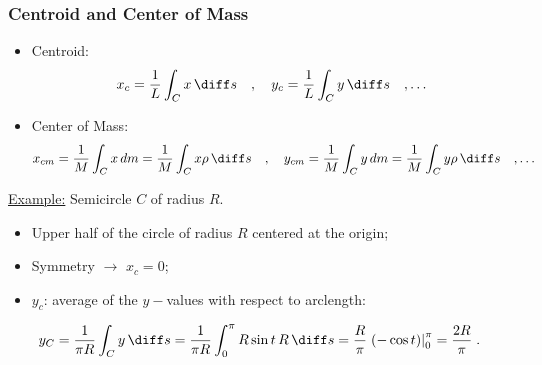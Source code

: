 \begin{frame}
\small
  \frametitle{Centroid and Center of Mass}

\begin{itemize}
\item Centroid:
	$$x_c = \frac{1}{L} \int_C x\, \diff s \quad , \quad  y_c = \frac{1}{L} \int_C y\, \diff s \quad ,  \ldots $$
	
	\item Center of Mass:
	$$x_{cm} = \frac{1}{M} \int_C x\, dm = \frac{1}{M} \int_C x \rho\, \diff s\quad , \quad  y_{cm}= \frac{1}{M} \int_C y\, dm = \frac{1}{M} \int_C y \rho\, \diff s\quad , \ldots $$
	\end{itemize}

  \underline{Example:} Semicircle $C$ of radius $R$.
  \pause
  \begin{itemize}
  \item Upper half of the circle of radius $R$ centered at the origin;
  \item Symmetry $\to$ $x_c = 0$;
  \item $y_c$: average of the $y-$values with respect to arclength:
  \end{itemize}
%
$$y_C = \frac{1}{\pi R} \int_C y\, \diff s = \frac{1}{\pi R}\int_{0}^{\pi} R\sin{t}\, R\, \diff s = \frac{R}{\pi} \left. (-\cos{t})\right|_0^\pi = \frac{2R}{\pi} \; .$$
\end{frame}